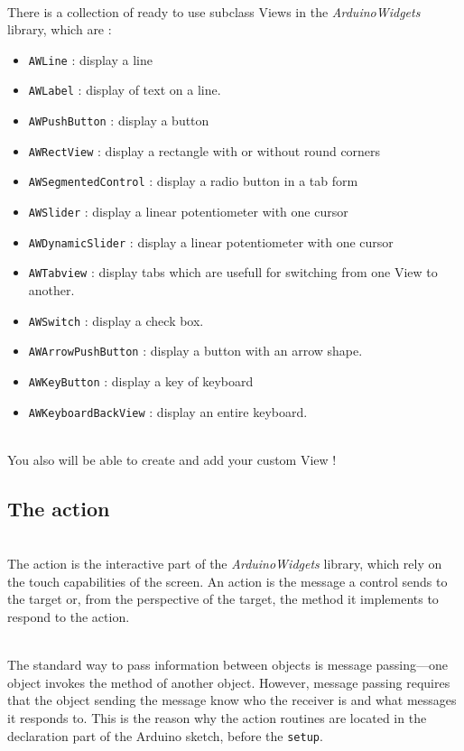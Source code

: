\documentclass[a4paper,11pt]{extarticle}
\begin{document}
~\\ There is a collection of ready to use subclass Views in the \emph{ArduinoWidgets} library, which are :
\begin{itemize}
\item \texttt{AWLine} : display a line
\item \texttt{AWLabel} : display of text on a line.
\item \texttt{AWPushButton} : display a button
\item \texttt{AWRectView} : display a rectangle with or without round corners
\item \texttt{AWSegmentedControl} : display a radio button in a tab form
\item \texttt{AWSlider} : display a linear potentiometer with one cursor
\item \texttt{AWDynamicSlider} : display a linear potentiometer with one cursor
\item \texttt{AWTabview} : display tabs which are usefull for switching from one View to another. 
\item \texttt{AWSwitch} : display a check box. 
\item \texttt{AWArrowPushButton} : display a button with an arrow shape. 
\item \texttt{AWKeyButton} : display a key of keyboard 
\item \texttt{AWKeyboardBackView} : display an entire keyboard. 
\end{itemize}

~\\ You also will be able to create and add your custom View !

\newpage
\subsection{The action}

~\\ The action is the interactive part of the \emph{ArduinoWidgets} library, which rely on the touch capabilities of the screen. An action is the message a control sends to the target or, from the perspective of the target, the method it implements to respond to the action. 

~\\The standard way to pass information between objects is message passing—one object invokes the method of another object. However, message passing requires that the object sending the message know who the receiver is and what messages it responds to. This is the reason why the action routines are located in the declaration part of the Arduino sketch, before the \texttt{setup}.
\end{document}
